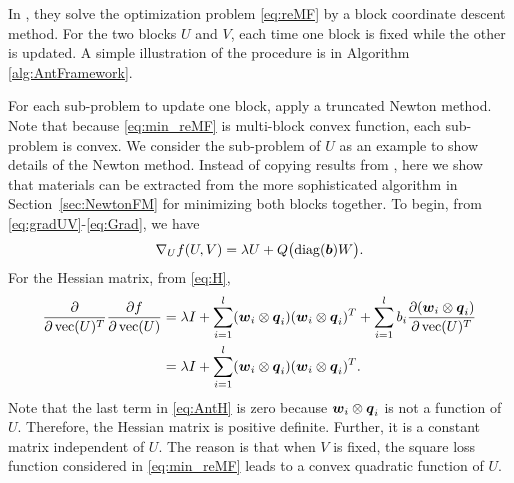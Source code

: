 \label{sec:ANT}

In \citet{WSC18a}, they solve the optimization problem \eqref{eq:reMF} by a block coordinate descent method. For the two blocks $U$ and $V$, each time one block is fixed while the other is updated. A simple illustration of the procedure is in Algorithm \ref{alg:AntFramework}.
\par For each sub-problem to update one block, \citet{WSC18a} apply a truncated Newton method. Note that because \eqref{eq:min_reMF} is multi-block convex function, each sub-problem is convex. We consider the sub-problem of $U$ as an example to show details of the Newton method. Instead of copying results from \citet{WSC18a}, here we show that materials can be extracted from the more sophisticated algorithm in Section~\ref{sec:NewtonFM} for minimizing both blocks together. To begin, from \eqref{eq:gradUV}-\eqref{eq:Grad}, we have 
\begin{align}
{\nabla}_U {f}(U, V) 
=\lambda U +   Q \bigl(\operatorname*{diag}(\boldsymbol{b}) W \bigr)  
\label{eq:AntGrad}.
\end{align}
For the Hessian matrix, from \eqref{eq:H}, 
\begin{align}
\frac{\partial }{\partial \operatorname*{vec}(U)^T} \frac{\partial f}{\partial \operatorname*{vec}(U)}
&=\lambda I + \sum_{i=1}^{l} (\boldsymbol{w}_i\otimes\boldsymbol{q}_i) (\boldsymbol{w}_i\otimes\boldsymbol{q}_i)^T + \sum_{i=1}^{l} b_i \frac{\partial (\boldsymbol{w}_i\otimes\boldsymbol{q}_i)}{\partial \operatorname*{vec}(U)^T}\label{eq:AntH}\\
&=\lambda I + \sum_{i=1}^{l} (\boldsymbol{w}_i\otimes\boldsymbol{q}_i) (\boldsymbol{w}_i\otimes\boldsymbol{q}_i)^T\label{eq:AntH_2}.
\end{align}
Note that the last term in \eqref{eq:AntH} is zero because $\boldsymbol{w}_i\otimes\boldsymbol{q}_i$ is not a function of $U$. Therefore, the Hessian matrix is positive definite. Further, it is a constant matrix independent of $U$. The reason is that when $V$ is fixed, the square loss function considered in \eqref{eq:min_reMF} leads to a convex quadratic function of $U$.

